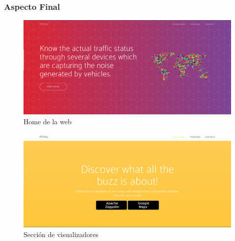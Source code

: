\bigskip

\subsubsection{Aspecto Final}

\begin{figure}[!ht]
  \begin{center}
    \includegraphics[scale=0.3]{../images/web/main1.png}
		\caption{Home de la web}
    \label{fig:kaa}
	\end{center}
\end{figure}

\begin{figure}[!ht]
  \begin{center}
    \includegraphics[scale=0.3]{../images/web/main2.png}
		\caption{Sección de visualizadores}
    \label{fig:kaa}
	\end{center}
\end{figure}

